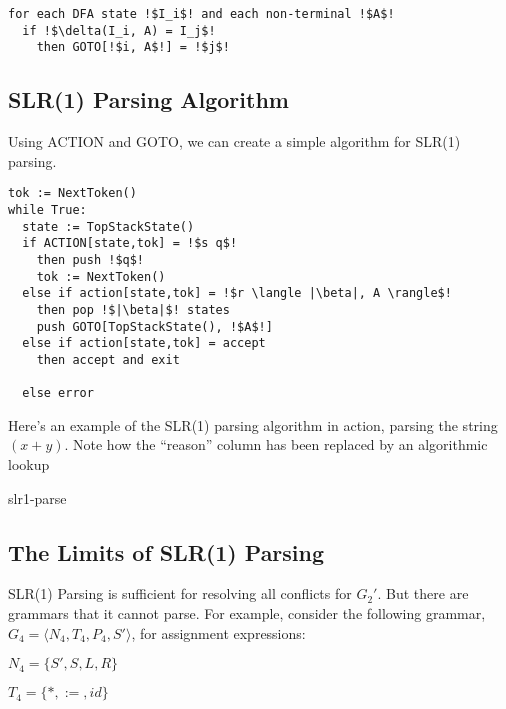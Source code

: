 \begin{code}
\begin{lstlisting}[style=pseudocode]
for each DFA state !$I_i$! and each non-terminal !$A$!
  if !$\delta(I_i, A) = I_j$! 
    then GOTO[!$i, A$!] = !$j$!
\end{lstlisting}
\vspace{1mm}
\end{code}

\subsection{SLR(1) Parsing Algorithm}
Using ACTION and GOTO, we can create a simple algorithm for SLR(1) parsing.

\begin{code}
\begin{lstlisting}[style=pseudocode]
tok := NextToken()
while True:
  state := TopStackState()
  if ACTION[state,tok] = !$s q$!
    then push !$q$!
    tok := NextToken()
  else if action[state,tok] = !$r \langle |\beta|, A \rangle$!
    then pop !$|\beta|$! states
    push GOTO[TopStackState(), !$A$!]
  else if action[state,tok] = accept
    then accept and exit
    
  else error
\end{lstlisting}
\vspace{1mm}
\end{code}

Here's an example of the SLR(1) parsing algorithm in action, parsing the string $(x+y)$. Note how the ``reason'' column has been replaced by an algorithmic lookup 
\begin{center}
    {slr1-parse}
\end{center}

\subsection{The Limits of SLR(1) Parsing}
SLR(1) Parsing is sufficient for resolving all conflicts for $G_2'$. But there are grammars that it cannot parse. For example, consider the following grammar, $G_4 = \langle N_4, T_4, P_4, S' \rangle$, for assignment expressions:
\begin{minipage}[t]{0.5\textwidth}
\begin{center}
$N_4 = \{ S', S, L, R \}$
\end{center}
\end{minipage}%
\begin{minipage}[t]{0.5\textwidth}
\begin{center}
$T_4 = \{ *,:=,id\}$
\end{center}
\end{minipage}

